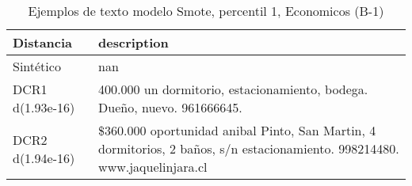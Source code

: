 \begin{table}[H]
\centering
\fontsize{10}{14}\selectfont
\caption{Ejemplos de texto modelo Smote, percentil 1, Economicos (B-1)}
\label{table-example-economicos-b-1-smote-enc-1p-text}
\begin{tabular}{|l|m{35em}|}
\hline
\rowcolor[gray]{0.8}
Distancia & description \\
\hline Sintético & nan \\
\hline DCR1 d(1.93e-16) & 400.000 un dormitorio, estacionamiento, bodega. Due\~no, nuevo. 961666645. \\
\hline DCR2 d(1.94e-16) & \$360.000 oportunidad anibal Pinto, San Martin, 4 dormitorios, 2 ba\~nos, s/n estacionamiento. 998214480. www.jaquelinjara.cl \\
\hline
\end{tabular}
\end{table}

